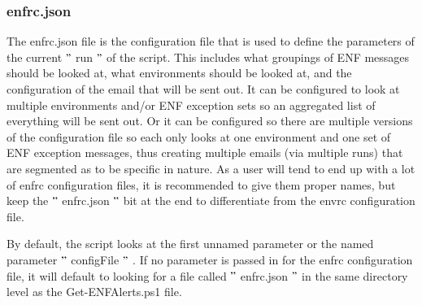 \documentclass[a4paper,12pt]{report}
\begin{document}
\subsubsection*{enfrc.json}
 \par
The enfrc.json file is the configuration file that is used to define the parameters of the current  $ " $ run $ " $  of the script. This includes what groupings of ENF messages should be looked at, what environments should be looked at, and the configuration of the email that will be sent out. It can be configured to look at multiple environments and/or ENF exception sets so an aggregated list of everything will be sent out. Or it can be configured so there are multiple versions of the configuration file so each only looks at one environment and one set of ENF exception messages, thus creating multiple emails (via multiple runs) that are segmented as to be specific in nature. As a user will tend to end up with a lot of enfrc configuration files, it is recommended to give them proper names, but keep the  $ " $ enfrc.json $ " $  bit at the end to differentiate from the envrc configuration file. \par
By default, the script looks at the first unnamed parameter or the named parameter  $ " $ configFile $ " $ . If no parameter is passed in for the enfrc configuration file, it will default to looking for a file called  $ " $ enfrc.json $ " $  in the same directory level as the Get-ENFAlerts.ps1 file. \par
\end{document}
